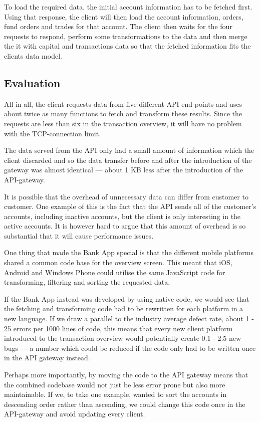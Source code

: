 \documentclass{cslthse-msc}
\begin{document}
To load the required data, the initial account information has to be fetched first. Using that response, the client will then load the account information, orders, fund orders and trades for that account. The client then waits for the four requests to respond, perform some transformations to the data and then merge the it with capital and transactions data so that the fetched information fits the clients data model.

\subsection{Evaluation}
All in all, the client requests data from five different API end-points and uses about twice as many functions to fetch and transform these results. Since the requests are less than six in the transaction overview, it will have no problem with the TCP-connection limit.

The data served from the API only had a small amount of information which the client discarded and so the data transfer before and after the introduction of the gateway was almost identical --- about 1 KB less after the introduction of the API-gateway.

It is possible that the overhead of unnecessary data can differ from customer to customer. One example of this is the fact that the API sends all of the customer's accounts, including inactive accounts, but the client is only interesting in the active accounts. It is however hard to argue that this amount of overhead is so substantial that it will cause performance issues.

One thing that made the Bank App special is that the different mobile platforms shared a common code base for the overview screen. This meant that iOS, Android and Windows Phone could utilise the same JavaScript code for transforming, filtering and sorting the requested data.

If the Bank App instead was developed by using native code, we would see that the fetching and transforming code had to be rewritten for each platform in a new language. If we draw a parallel to the industry average defect rate, about 1 - 25 errors per 1000 lines of code\cite{code_complete}, this means that every new client platform introduced to the transaction overview would potentially create 0.1 - 2.5 new bugs --- a number which could be reduced if the code only had to be written once in the API gateway instead.

Perhaps more importantly, by moving the code to the API gateway means that the combined codebase would not just be less error prone but also more maintainable. If we, to take one example, wanted to sort the accounts in descending order rather than ascending, we could change this code once in the API-gateway and avoid updating every client. 
\end{document}

